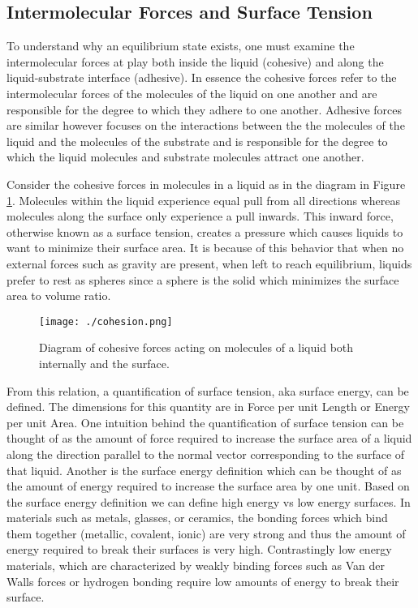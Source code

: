\documentclass{article}
\begin{document}
\subsection{Intermolecular Forces and Surface Tension}
To understand why an equilibrium state exists, one must examine the intermolecular forces at play both inside the liquid (cohesive) and along the liquid-substrate interface (adhesive). In essence the cohesive forces refer to the intermolecular forces of the molecules of the liquid on one another and are responsible for the degree to which they adhere to one another. Adhesive forces are similar however focuses on the interactions between the the molecules of the liquid and the molecules of the substrate and is responsible for the degree to which the liquid molecules and substrate molecules attract one another.

Consider the cohesive forces in molecules in a liquid as in the diagram in Figure \ref{fig:cohesion_molec}. Molecules within the liquid experience equal pull from all directions whereas molecules along the surface only experience a pull inwards. This inward force, otherwise known as a surface tension, creates a pressure which causes liquids to want to minimize their surface area. It is because of this behavior that when no external forces such as gravity are present, when left to reach equilibrium, liquids prefer to rest as spheres since a sphere is the solid which minimizes the surface area to volume ratio.

\begin{figure}[H]
\caption{Diagram of cohesive forces acting on molecules of a liquid both internally and the surface.}
\centering
\texttt{[image: ./cohesion.png]}
\label{fig:cohesion_molec}
\end{figure}

From this relation, a quantification of surface tension, aka surface energy, can be defined. The dimensions for this quantity are in Force per unit Length or Energy per unit Area. One intuition behind the quantification of surface tension can be thought of as the amount of force required to increase the surface area of a liquid along the direction parallel to the normal vector corresponding to the surface of that liquid. Another is the surface energy definition which can be thought of as the amount of energy required to increase the surface area by one unit. Based on the surface energy definition we can define high energy vs low energy surfaces. In materials such as metals, glasses, or ceramics, the bonding forces which bind them together (metallic, covalent, ionic) are very strong and thus the amount of energy required to break their surfaces is very high. Contrastingly low energy materials, which are characterized by weakly binding forces such as Van der Walls forces or hydrogen bonding require low amounts of energy to break their surface. 
\end{document}
